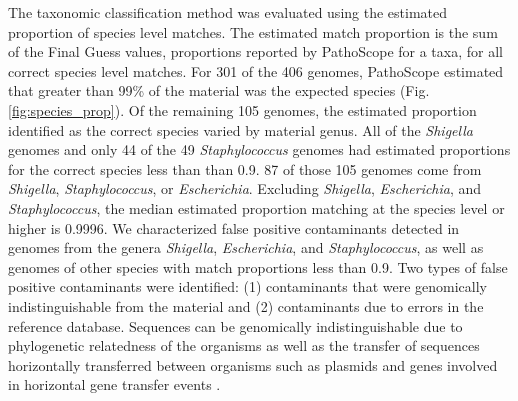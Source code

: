 \documentclass[fleqn,10pt,lineno]{wlpeerj}\usepackage[]{graphicx}\usepackage[]{color}
\begin{document}
The taxonomic classification method was evaluated using the estimated proportion of species level matches.
The estimated match proportion is the sum of the Final Guess values, proportions reported by PathoScope for a taxa, for all correct species level matches.
For 301 of the 406 genomes, PathoScope estimated that greater than 99\% of the material was the expected species (Fig. \ref{fig:species_prop}).
Of the remaining 105 genomes, the estimated proportion identified as the correct species varied by material genus.
All of the \textit{Shigella} genomes and only 44 of the 49 \textit{Staphylococcus} genomes had estimated proportions for the correct species less than than 0.9.
87 of those 105 genomes come from \textit{Shigella}, \textit{Staphylococcus}, or \textit{Escherichia}.
Excluding \textit{Shigella}, \textit{Escherichia}, and \textit{Staphylococcus}, the median estimated proportion matching at the species level or higher is  0.9996.
We characterized false positive contaminants detected in genomes from the genera \textit{Shigella}, \textit{Escherichia}, and \textit{Staphylococcus}, as well as genomes of other species with match proportions less than 0.9.
Two types of false positive contaminants were identified: (1) contaminants that were genomically indistinguishable from the material and (2) contaminants due to errors in the reference database. 
Sequences can be genomically indistinguishable due to phylogenetic relatedness of the organisms as well as the transfer of sequences horizontally transferred between organisms such as plasmids and genes involved in horizontal gene transfer events \citep{shintani2015genomics,polz2013horizontal}.
\end{document}
